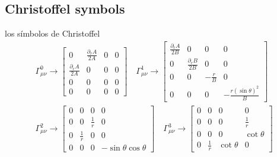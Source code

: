 \subsection{Christoffel symbols}
los símbolos de Christoffel
\begin{equation}
    \begin{gathered}
        \Gamma_{\mu \nu}^0 \rightarrow\left[\begin{array}{cccc}
                0                        & \frac{\partial_r A}{2 A} & 0 & 0 \\
                \frac{\partial_r A}{2 A} & 0                        & 0 & 0 \\
                0                        & 0                        & 0 & 0 \\
                0                        & 0                        & 0 & 0
            \end{array}\right]
        \quad
        \Gamma_{\mu \nu}^1 \rightarrow\left[\begin{array}{cccc}
                \frac{\partial_r A}{2 B} & 0                        & 0            & 0                           \\
                0                        & \frac{\partial_r B}{2 B} & 0            & 0                           \\
                0                        & 0                        & -\frac{r}{B} & 0                           \\
                0                        & 0                        & 0            & -\frac{r(\sin \theta)^2}{B}
            \end{array}\right] \\
        \Gamma_{\mu \nu}^2 \rightarrow\left[\begin{array}{cccc}
                0 & 0           & 0           & 0                        \\
                0 & 0           & \frac{1}{r} & 0                        \\
                0 & \frac{1}{r} & 0           & 0                        \\
                0 & 0           & 0           & -\sin \theta \cos \theta
            \end{array}\right]
        \quad
        \Gamma_{\mu \nu}^3 \rightarrow\left[\begin{array}{cccc}
                0 & 0           & 0           & 0           \\
                0 & 0           & 0           & \frac{1}{r} \\
                0 & 0           & 0           & \cot \theta \\
                0 & \frac{1}{r} & \cot \theta & 0
            \end{array}\right]
    \end{gathered}
\end{equation}


